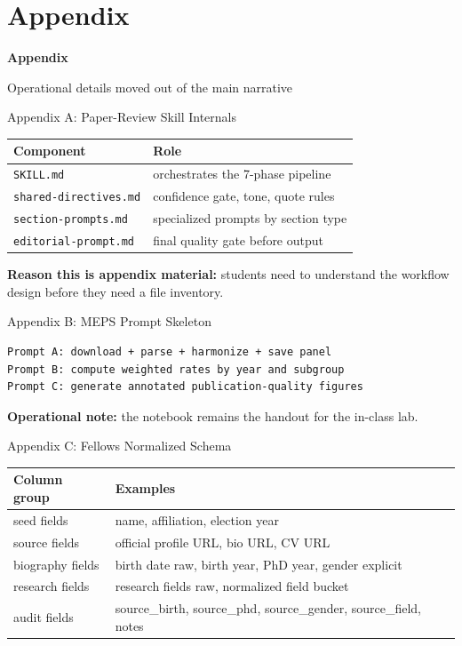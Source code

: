 \documentclass[10pt,english,aspectratio=169]{beamer}
\newcommand{\sectiondivider}[2]{%
\begin{frame}[plain,noframenumbering]
\begin{center}
\vfill
{\Large\textbf{#1}\par}
\vspace{0.35cm}
{\normalsize #2\par}
\vfill
\end{center}
\end{frame}
}
\begin{document}

\appendix
\section{Appendix}

\sectiondivider{Appendix}{Operational details moved out of the main narrative}

\begin{frame}{Appendix A: Paper-Review Skill Internals}
\small
\begin{tabular}{lp{9.2cm}}
\toprule
\textbf{Component} & \textbf{Role} \\
\midrule
\texttt{SKILL.md} & orchestrates the 7-phase pipeline \\
\texttt{shared-directives.md} & confidence gate, tone, quote rules \\
\texttt{section-prompts.md} & specialized prompts by section type \\
\texttt{editorial-prompt.md} & final quality gate before output \\
\bottomrule
\end{tabular}

\vspace{0.3cm}
\textbf{Reason this is appendix material:} students need to understand the workflow design before they need a file inventory.
\end{frame}

\begin{frame}[fragile]{Appendix B: MEPS Prompt Skeleton}
\begin{lstlisting}[style=pythonstyle, language={}, basicstyle=\ttfamily\scriptsize, numbers=none]
Prompt A: download + parse + harmonize + save panel
Prompt B: compute weighted rates by year and subgroup
Prompt C: generate annotated publication-quality figures
\end{lstlisting}

\vspace{0.25cm}
\textbf{Operational note:} the notebook remains the handout for the in-class lab.
\end{frame}

\begin{frame}{Appendix C: Fellows Normalized Schema}
\small
\begin{tabular}{p{3.6cm}p{8.1cm}}
\toprule
\textbf{Column group} & \textbf{Examples} \\
\midrule
seed fields & name, affiliation, election year \\
source fields & official profile URL, bio URL, CV URL \\
biography fields & birth date raw, birth year, PhD year, gender explicit \\
research fields & research fields raw, normalized field bucket \\
audit fields & source\_birth, source\_phd, source\_gender, source\_field, notes \\
\bottomrule
\end{tabular}
\end{frame}
\end{document}
